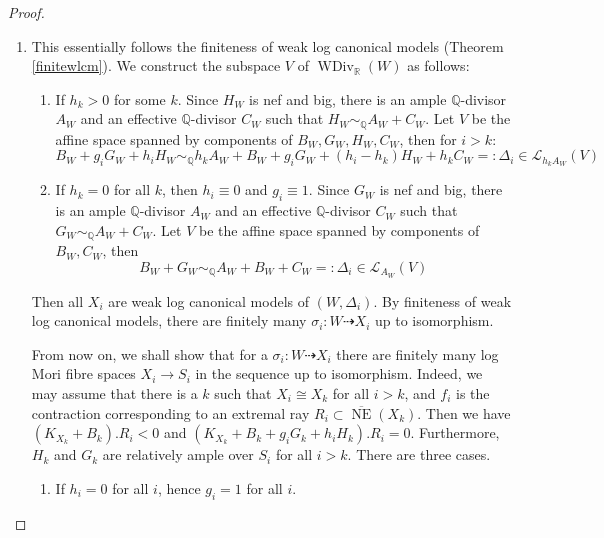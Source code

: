 \documentclass[11pt]{amsart}
\begin{document}
\begin{proof}
  \begin{enumerate}
    \item This essentially follows the finiteness of weak log canonical models (Theorem \ref{finitewlcm}). We construct the subspace $V$ of $\operatorname{WDiv}_{\mathbb{R}}(W)$ as follows:
          \begin{enumerate}
            \item If $h_{k}>0$ for some $k$. Since $H_{W}$ is nef and big,  there is an  ample $\mathbb{Q}$-divisor $A_{W}$ and an effective $\mathbb{Q}$-divisor $C_{W}$  such that $H_{W}\sim_{\mathbb{Q}}A_{W}+C_{W}$. Let $V$ be the affine space spanned by components of  $B_{W},G_{W},H_{W},C_{W}$, then for $i>k$:
                  \[
                    B_{W}+g_{i}G_{W}+h_{i}H_{W}\sim_{\mathbb{Q}} h_{k}A_{W}+B_{W}+g_{i}G_{W}+(h_{i}-h_{k})H_{W}+h_{k}C_{W}=:\Delta_{i} \in \mathcal{L}_{h_{k}A_{W}}(V)
                  \]
            \item If $h_{k}=0$ for all $k$, then $h_{i}\equiv 0$ and $g_{i}\equiv 1$.  Since $G_{W}$ is nef and big,  there is  an  ample $\mathbb{Q}$-divisor $A_{W}$ and an effective $\mathbb{Q}$-divisor $C_{W}$  such that $G_{W}\sim_{\mathbb{Q}}A_{W}+C_{W}$. Let $V$ be the affine space spanned by components of  $B_{W},C_{W}$, then
                  \[
                    B_{W}+G_{W}\sim_{\mathbb{Q}} A_{W}+B_{W}+C_{W}=:\Delta_{i} \in \mathcal{L}_{A_{W}}(V)
                  \]
          \end{enumerate}
          Then all $X_{i}$ are weak log canonical models of $(W,\Delta_{i})$. By finiteness of weak log canonical models, there are finitely many $\sigma_{i}: W\dashrightarrow X_{i}$ up to isomorphism.

          From now on, we shall show that for a $\sigma_{i}: W\dashrightarrow X_{i}$ there are finitely many log Mori fibre spaces $X_i\to S_i$ in the sequence up to isomorphism.
          Indeed, we may assume that there is a $k$ such that $X_{i} \cong X_{k}$ for all $i>k$, and  $f_{i}$ is the contraction corresponding to an extremal ray $R_{i} \subset \overline{\operatorname{NE}}(X_{k}) $. Then we have $(K_{X_{k}}+B_{k}).R_{i}<0  $ and $(K_{X_{k}}+B_{k}+g_{i}G_{k}+h_{i}H_{k}).R_{i}=0$. Furthermore, $H_{k}$ and $G_{k}$ are relatively ample over $S_{i}$ for all $i>k$. There are three cases.


          \begin{enumerate}
            \item If $h_{i}=0$ for all $i$, hence $g_{i}=1$ for all $i$.


\end{enumerate}
\end{enumerate}
\end{proof}
\end{document}
